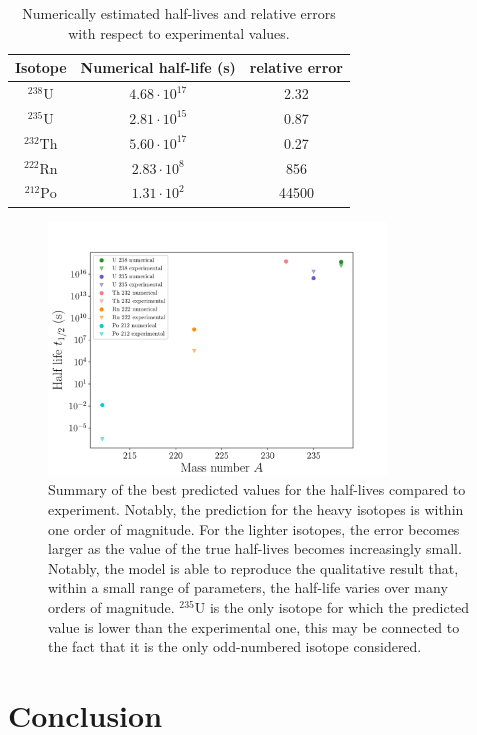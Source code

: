 \documentclass[a4paper,DIV=12,english]{scrartcl}
\begin{document}
\begin{table}
    \centering
    \caption{Numerically estimated half-lives and relative errors with respect to experimental values.}
    \begin{tabular}{c|cc}
        Isotope & Numerical half-life (s) & relative error \\
        \hline
        $^{238}\text{U}$ & $4.68\cdot 10^{17}$ & 2.32 \\ 
        $^{235}\text{U}$ & $2.81\cdot 10^{15}$ & 0.87 \\ 
        $^{232}\text{Th}$ & $5.60\cdot 10^{17}$ & 0.27 \\
        $^{222}\text{Rn}$ & $2.83\cdot 10^{8}$ & 856 \\
        $^{212}\text{Po}$ & $1.31\cdot 10^{2}$ & 44500 \\        
    \end{tabular}
    \label{tab:result}
\end{table}

\begin{figure}
    \centering
    \includegraphics[width=0.8\textwidth]{../plots/summary_t.pdf}
    \caption{Summary of the best predicted values for the half-lives compared to experiment. Notably, the prediction for the heavy isotopes is within one order of magnitude. For the lighter isotopes, the error becomes larger as the value of the true half-lives becomes increasingly small. Notably, the model is able to reproduce the qualitative result that, within a small range of parameters, the half-life varies over many orders of magnitude. $^{235}\text{U}$ is the only isotope for which the predicted value is lower than the experimental one, this may be connected to the fact that it is the only odd-numbered isotope considered.}
    \label{fig:summary}
\end{figure}



\section{Conclusion}

\newpage
\FloatBarrier
\printbibliography
\end{document}
